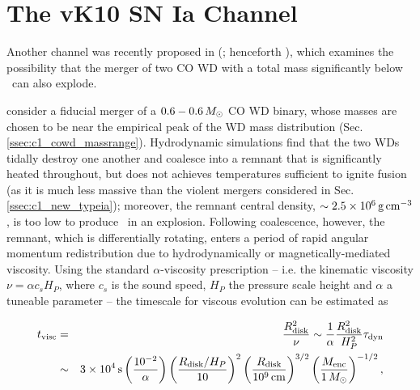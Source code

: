 
\section{The vK10 SN Ia Channel}
\label{sec:c1_vkchannel}

Another channel was recently proposed in \citeauthor{vkercj10} (\citeyear{vkercj10}; henceforth \citeal{vkercj10}), which examines the possibility that the merger of two CO WD with a total mass significantly below \Mch\ can also explode.

\citeal{vkercj10} consider a fiducial merger of a $0.6-0.6\,\Msun$ CO WD binary, whose masses are chosen to be near the empirical peak of the WD mass distribution (Sec. \ref{ssec:c1_cowd_massrange}).  Hydrodynamic simulations \citep{loreig09} find that the two WDs tidally destroy one another and coalesce into a remnant that is significantly heated throughout, but does not achieves temperatures sufficient to ignite fusion (as it is much less massive than the violent mergers considered in Sec. \ref{ssec:c1_new_typeia}); moreover, the remnant central density, $\sim2.5\times10^6\,\gcc$, is too low to produce \Ni\ in an explosion.  Following coalescence, however, the remnant, which is differentially rotating, enters a period of rapid angular momentum redistribution due to hydrodynamically or magnetically-mediated viscosity.  Using the standard $\alpha$-viscosity prescription \citep{shaks73} -- i.e. the kinematic viscosity $\nu = \alpha c_s H_P$, where $c_s$ is the sound speed, $H_P$ the pressure scale height and $\alpha$ a tuneable parameter -- the timescale for viscous evolution can be estimated as

\begin{eqnarray}
t_\mrm{visc} &=& \frac{R_\mrm{disk}^2}{\nu} \sim \frac{1}{\alpha}\frac{R_\mrm{disk}^2}{H_P^2}\taudyn \nonumber \\
			&\sim& 3\times10^4\,\mrm{s}\left(\frac{10^{-2}}{\alpha}\right)\left(\frac{R_\mrm{disk}/H_P}{10}\right)^2\left(\frac{R_\mrm{disk}}{10^9\,\mrm{cm}}\right)^{3/2}\left(\frac{M_\mrm{enc}}{1\,\Msun}\right)^{-1/2},
\end{eqnarray}

